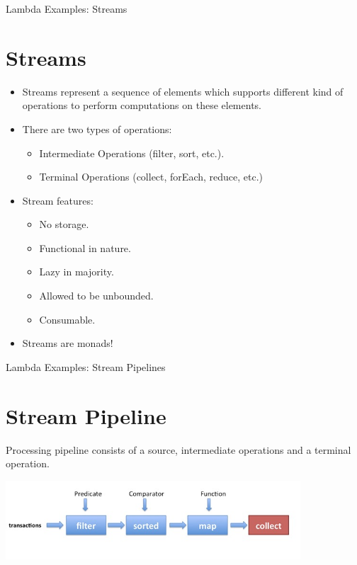 \documentclass{beamer}
\begin{document}
	\begin{frame}[fragile]{Lambda Examples: Streams}
		\section{Streams}
		
			\begin{itemize}
				\item Streams represent a sequence of elements which supports different kind of operations to perform computations on these elements. 
				\item There are two types of operations:
				\begin{itemize}
					\item Intermediate Operations (filter, sort, etc.). 
					\item Terminal Operations (collect, forEach, reduce, etc.)
				\end{itemize}

				\item Stream features:
				\begin{itemize}
				\item No storage. 
				\item Functional in nature.
				\item Lazy in majority.
				\item Allowed to be unbounded.
				\item Consumable.
				\end{itemize}
				\item Streams are monads!
			\end{itemize}

	\end{frame}	

	\begin{frame}[fragile]{Lambda Examples: Stream Pipelines}
		\section{Stream Pipeline}
		
		Processing pipeline consists of a source, intermediate operations and a terminal operation.
		
		\includegraphics[width=11cm]{pipeline}	
		
	\end{frame}	
\end{document}
